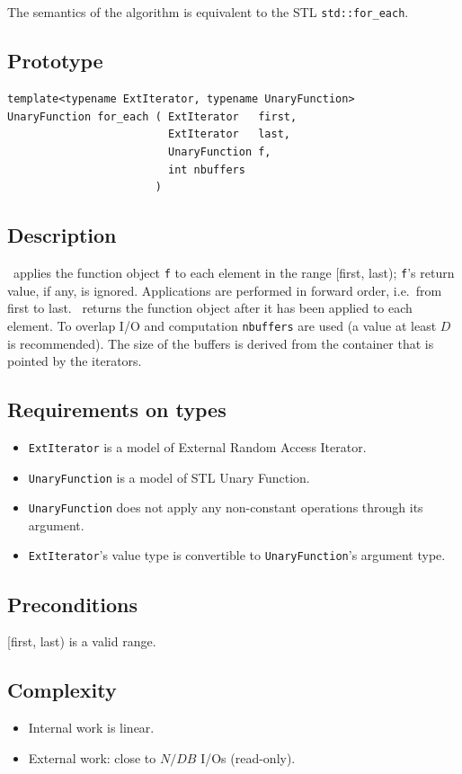 \documentclass[twoside]{book}
\begin{document}
\subsection{\xforeach}
The semantics of the algorithm is equivalent to the STL
\texttt{std::for\_each}. 

\subsection*{Prototype}
\begin{lstlisting}
template<typename ExtIterator, typename UnaryFunction>
UnaryFunction for_each ( ExtIterator   first,
                         ExtIterator   last,
                         UnaryFunction f,
                         int nbuffers
                       )        
\end{lstlisting}
\subsection*{Description}
\xforeach\ applies the function object \texttt{f} to each element in the range
[first, last); \texttt{f}'s return value, if any, is
ignored. Applications are 
performed in forward order, i.e.\ from first to last. \xforeach\ returns
the function object after it has been applied to each element. 
 To
overlap I/O and computation \texttt{nbuffers} are used (a value at
least $D$ is recommended). The size of
the buffers is derived from the container that is pointed by the
iterators. 
\subsection*{Requirements on types}
\begin{itemize}
\item \texttt{ExtIterator} is a model of External Random Access
Iterator.
\item \texttt{UnaryFunction} is a model of STL Unary Function.
\item \texttt{UnaryFunction} does not apply any non-constant
operations through its argument.
\item \texttt{ExtIterator}'s value type is convertible to
\texttt{UnaryFunction}'s argument type.
\end{itemize}
\subsection*{Preconditions}
[first, last) is a valid range.
\subsection*{Complexity}
\begin{itemize}
\item Internal work is linear.
\item External work: close to $N/DB$ I/Os (read-only).
\end{itemize}
\end{document}
